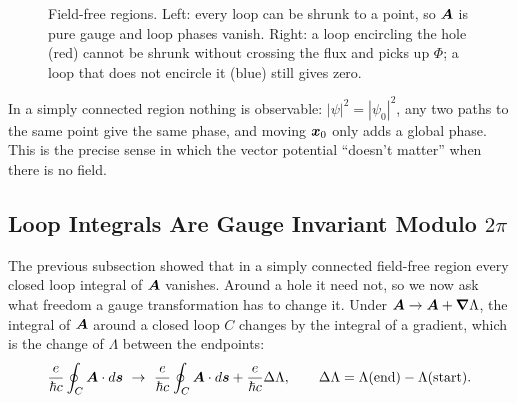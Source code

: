 \begin{figure}[ht]
\centering
{}
\caption{Field-free regions. Left: every loop can be shrunk to a point, so $\vect{A}$ is pure gauge and loop phases vanish. Right: a loop encircling the hole (red) cannot be shrunk without crossing the flux and picks up $\Phi$; a loop that does not encircle it (blue) still gives zero.}
\label{fig:simply-connected}
\end{figure}

In a simply connected region nothing is observable: $|\psi|^2 = |\psi_0|^2$, any two paths to the same point give the same phase, and moving $\bm{x}_0$ only adds a global phase. This is the precise sense in which the vector potential ``doesn't matter'' when there is no field.

\subsection{Loop Integrals Are Gauge Invariant Modulo \texorpdfstring{$2\pi$}{2 pi}}

The previous subsection showed that in a simply connected field-free region every closed loop integral of $\vect{A}$ vanishes. Around a hole it need not, so we now ask what freedom a gauge transformation has to change it. Under $\vect{A}\to\vect{A} + \grad\Lambda$, the integral of $\vect{A}$ around a closed loop $C$ changes by the integral of a gradient, which is the change of $\Lambda$ between the endpoints:
\[
    \frac{e}{\hbar c}\oint_C\vect{A}\cdot d\lvect{s}\ \to\ \frac{e}{\hbar c}\oint_C\vect{A}\cdot d\lvect{s} + \frac{e}{\hbar c}\Delta\Lambda,
    \qquad
    \Delta\Lambda = \Lambda(\text{end}) - \Lambda(\text{start}).
\]

